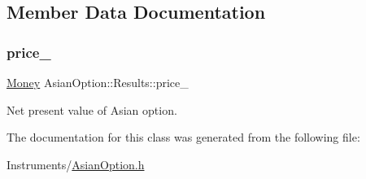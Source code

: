 \subsection{Member Data Documentation}
\hypertarget{class_asian_option_1_1_results_a9e4e4e2612f105b940b1562d7f126a89}{}\label{class_asian_option_1_1_results_a9e4e4e2612f105b940b1562d7f126a89} 
\subsubsection{\texorpdfstring{price\+\_\+}{price\_}}
{\footnotesize\ttfamily \hyperlink{_name_def_8h_a5a9d48c16a694e9a2d9f1eca730dc8c5}{Money} Asian\+Option\+::\+Results\+::price\+\_\+}



Net present value of Asian option. 



The documentation for this class was generated from the following file\+:\begin{DoxyCompactItemize}
\item 
Instruments/\hyperlink{_asian_option_8h}{Asian\+Option.\+h}\end{DoxyCompactItemize}
